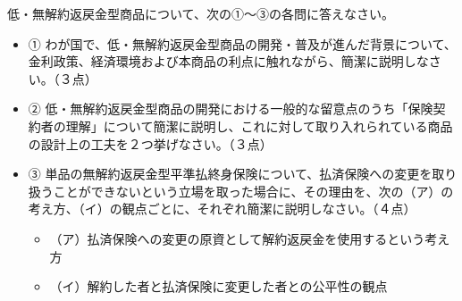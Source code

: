 \documentclass[report,gutter=10mm,fore-edge=10mm,uplatex,dvipdfmx]{jlreq}
\begin{document}
低・無解約返戻金型商品について、次の①～③の各問に答えなさい。
\begin{itemize}
 \item ① わが国で、低・無解約返戻金型商品の開発・普及が進んだ背景について、金利政策、経済環境および本商品の利点に触れながら、簡潔に説明しなさい。（３点）
 \item ② 低・無解約返戻金型商品の開発における一般的な留意点のうち「保険契約者の理解」について簡潔に説明し、これに対して取り入れられている商品の設計上の工夫を２つ挙げなさい。（３点）
 \item ③ 単品の無解約返戻金型平準払終身保険について、払済保険への変更を取り扱うことができないという立場を取った場合に、その理由を、次の（ア）の考え方、（イ）の観点ごとに、それぞれ簡潔に説明しなさい。（４点）
\begin{itemize}
 \item （ア）払済保険への変更の原資として解約返戻金を使用するという考え方
 \item （イ）解約した者と払済保険に変更した者との公平性の観点
\end{itemize}
\end{itemize}
\end{document}
